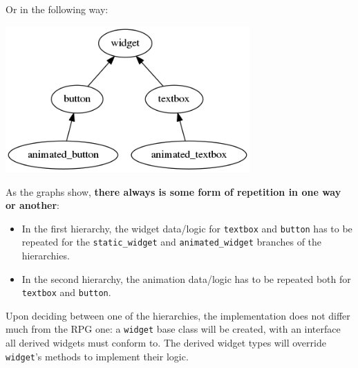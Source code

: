 \documentclass[twoside, 12pt, a4paper, openany]{book}
\let\origfigure=\figure
\let\endorigfigure=\endfigure
\renewenvironment{figure}[1][]{%
\origfigure[H]
}{%
\endorigfigure
}
\begin{document}
Or in the following way:

\begin{figure}[htbp]
\centering
\includegraphics[width=0.70000\textwidth]{source/figures/generated/ecs/overview/oop/repetition_problem_2.png}
\caption{OOP encoding issue: repetition \#2}
\end{figure}

As the graphs show, \textbf{there always is some form of repetition in
one way or another}:

\begin{itemize}
\item
  In the first hierarchy, the widget data/logic for
  \texttt{textbox}
  and
  \texttt{button}
  has to be repeated for the
  \texttt{static_widget}
  and
  \texttt{animated_widget}
  branches of the hierarchies.
\item
  In the second hierarchy, the animation data/logic has to be repeated
  both for
  \texttt{textbox}
  and
  \texttt{button}.
\end{itemize}

Upon deciding between one of the hierarchies, the implementation does
not differ much from the RPG one: a
\texttt{widget}
base class will be created, with an interface all derived widgets must
conform to. The derived widget types will override
\texttt{widget}'s
methods to implement their logic.
\end{document}
